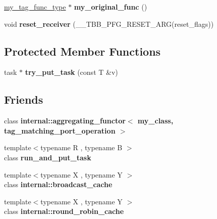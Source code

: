 \begin{DoxyCompactItemize}
\item 
\hypertarget{classinternal_1_1tag__matching__port_acf14f6763a2442684e37242ac61fb72d}{}\hyperlink{classinternal_1_1function__body}{my\+\_\+tag\+\_\+func\+\_\+type} $\ast$ {\bfseries my\+\_\+original\+\_\+func} ()\label{classinternal_1_1tag__matching__port_acf14f6763a2442684e37242ac61fb72d}

\item 
\hypertarget{classinternal_1_1tag__matching__port_a7a73704ff5f471c7fe620f1245798132}{}void {\bfseries reset\+\_\+receiver} (\+\_\+\+\_\+\+T\+B\+B\+\_\+\+P\+F\+G\+\_\+\+R\+E\+S\+E\+T\+\_\+\+A\+R\+G(reset\+\_\+flags))\label{classinternal_1_1tag__matching__port_a7a73704ff5f471c7fe620f1245798132}

\end{DoxyCompactItemize}
\subsection*{Protected Member Functions}
\begin{DoxyCompactItemize}
\item 
\hypertarget{classinternal_1_1tag__matching__port_aedc5cd1f541a81fe57215bd68521e962}{}task $\ast$ {\bfseries try\+\_\+put\+\_\+task} (const T \&v)\label{classinternal_1_1tag__matching__port_aedc5cd1f541a81fe57215bd68521e962}

\end{DoxyCompactItemize}
\subsection*{Friends}
\begin{DoxyCompactItemize}
\item 
\hypertarget{classinternal_1_1tag__matching__port_a7b1b4a3d3fa25f0505b42d56aa82c758}{}class {\bfseries internal\+::aggregating\+\_\+functor$<$ my\+\_\+class, tag\+\_\+matching\+\_\+port\+\_\+operation $>$}\label{classinternal_1_1tag__matching__port_a7b1b4a3d3fa25f0505b42d56aa82c758}

\item 
\hypertarget{classinternal_1_1tag__matching__port_abaf9bf74ca5f2854d09f5f07337280eb}{}{\footnotesize template$<$typename R , typename B $>$ }\\class {\bfseries run\+\_\+and\+\_\+put\+\_\+task}\label{classinternal_1_1tag__matching__port_abaf9bf74ca5f2854d09f5f07337280eb}

\item 
\hypertarget{classinternal_1_1tag__matching__port_a1360e38efe396058978cf3754ad620f5}{}{\footnotesize template$<$typename X , typename Y $>$ }\\class {\bfseries internal\+::broadcast\+\_\+cache}\label{classinternal_1_1tag__matching__port_a1360e38efe396058978cf3754ad620f5}

\item 
\hypertarget{classinternal_1_1tag__matching__port_acbd9ac2610587a99cd7d43344297cc49}{}{\footnotesize template$<$typename X , typename Y $>$ }\\class {\bfseries internal\+::round\+\_\+robin\+\_\+cache}\label{classinternal_1_1tag__matching__port_acbd9ac2610587a99cd7d43344297cc49}

\end{DoxyCompactItemize}
